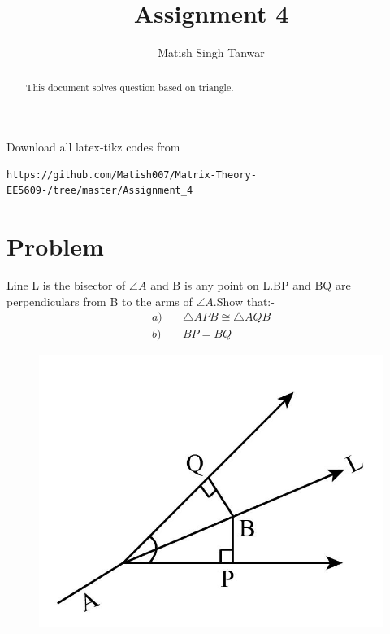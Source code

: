 \documentclass[journal,12pt,twocolumn]{IEEEtran}
\begin{document}
      \def\midbox#1{\raisebox{-0.5\baselineskip}[0in][0in]{#1}}
 \vspace{3cm}
 \title{Assignment 4}
 \author{Matish Singh Tanwar}
 \maketitle
 \newpage
 \bigskip
 \renewcommand{\thetable}{\theenumi}
\vspace{1.0cm}
\begin{abstract}
This document solves question based on triangle.
\end{abstract}
\vspace{0.5cm}
%
Download all latex-tikz codes from 
\begin{lstlisting}
https://github.com/Matish007/Matrix-Theory-EE5609-/tree/master/Assignment_4
\end{lstlisting}
%
\vspace{0.5mm}
\section{Problem}
Line L is the bisector of $\angle{A}$ and B is any point on L.BP and BQ are perpendiculars from B to the arms of $\angle{A}$.Show that:-
\begin{align}
    a) &\quad \triangle APB \cong\triangle AQB\\
    b) & \quad BP=BQ
\end{align}
\begin{figure}[!htb]
	\centering
	\includegraphics[width=\columnwidth]{fig.jpg}
	\caption{\label{fig1}}
	\label{fig:1}
\end{figure}
\end{document}

